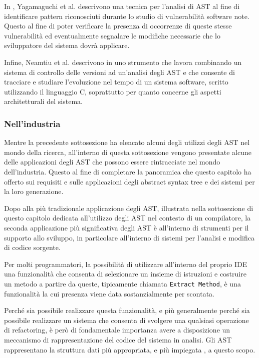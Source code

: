 In \cite{DBLP:conf/acsac/YamaguchiLR12}, Yagamaguchi et al. descrivono una
tecnica per l’analisi di AST al fine di identificare pattern riconosciuti
durante lo studio di vulnerabilità software note. Questo al fine di poter
verificare la presenza di occorrenze di queste stesse vulnerabilità ed
eventualmente segnalare le modifiche necessarie che lo sviluppatore del sistema
dovrà applicare.

Infine, Neamtiu et al. descrivono in \cite{DBLP:journals/sigsoft/NeamtiuFH05}
uno strumento che lavora combinando un sistema di controllo delle versioni ad
un’analisi degli AST e che consente di tracciare e studiare l’evoluzione nel
tempo di un sistema software, scritto utilizzando il linguaggio C, soprattutto
per quanto concerne gli aspetti architetturali del sistema.

\subsubsection{Nell’industria}

Mentre la precedente sottosezione ha elencato alcuni degli utilizzi degli AST
nel mondo della ricerca, all’interno di questa sottosezione vengono presentate
alcune delle applicazioni degli AST che possono essere rintracciate nel mondo
dell’industria. Questo al fine di completare la panoramica che questo capitolo
ha offerto sui requisiti e sulle applicazioni degli abstract syntax tree e dei
sistemi per la loro generazione.

Dopo alla più tradizionale applicazione degli AST, illustrata nella sottosezione
di questo capitolo dedicata all’utilizzo degli AST nel contesto di un
compilatore, la seconda applicazione più significativa degli AST è all’interno
di strumenti per il supporto allo sviluppo, in particolare all’interno di
sistemi per l'analisi e modifica di codice sorgente.

Per molti programmatori, la possibilità di utilizzare all’interno del proprio
IDE una funzionalità che consenta di selezionare un insieme di istruzioni e
costruire un metodo a partire da queste, tipicamente chiamata \texttt{Extract
Method}, è una funzionalità la cui presenza viene data sostanzialmente per
scontata.

Perché sia possibile realizzare questa funzionalità, e più generalmente perché
sia possibile realizzare un sistema che consenta di svolgere una qualsiasi
operazione di refactoring, è però di fondamentale importanza avere a
disposizione un meccanismo di rappresentazione del codice del sistema in
analisi. Gli AST rappresentano la struttura dati più appropriata, e più
impiegata \cite{eclipse2006} \cite{netbeans2007}, a questo scopo.

